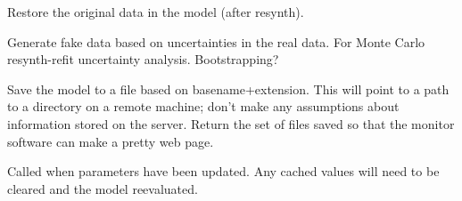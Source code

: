 \documentclass[letterpaper,10pt,english]{sphinxmanual}
\begin{document}
\begin{fulllineitems}

\begin{fulllineitems}
\label{api/fitproblem:refl1d.fitproblem.Fitness.restore_data}
Restore the original data in the model (after resynth).

\end{fulllineitems}


\begin{fulllineitems}
\label{api/fitproblem:refl1d.fitproblem.Fitness.resynth_data}
Generate fake data based on uncertainties in the real data.  For Monte Carlo
resynth-refit uncertainty analysis.  Bootstrapping?

\end{fulllineitems}


\begin{fulllineitems}
\label{api/fitproblem:refl1d.fitproblem.Fitness.save}
Save the model to a file based on basename+extension.  This will point to
a path to a directory on a remote machine; don't make any assumptions about
information stored on the server.  Return the set of files saved so that
the monitor software can make a pretty web page.

\end{fulllineitems}


\begin{fulllineitems}
\label{api/fitproblem:refl1d.fitproblem.Fitness.update}
Called when parameters have been updated.  Any cached values will need to
be cleared and the model reevaluated.

\end{fulllineitems}


\end{fulllineitems}

\end{document}
